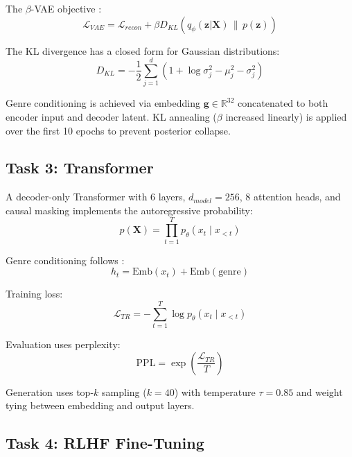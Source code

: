\documentclass[conference]{IEEEtran}
\begin{document}
The $\beta$-VAE objective \cite{higgins2017betavae}:
\begin{equation}
\mathcal{L}_{VAE} = \mathcal{L}_{recon} + \beta
D_{KL}\!\left(q_\phi(\mathbf{z}|\mathbf{X}) \,\|\, p(\mathbf{z})\right)
\end{equation}

The KL divergence has a closed form for Gaussian distributions:
\begin{equation}
D_{KL} = -\frac{1}{2}\sum_{j=1}^{d}
\left(1 + \log\sigma_j^2 - \mu_j^2 - \sigma_j^2\right)
\end{equation}

Genre conditioning is achieved via embedding
$\mathbf{g} \in \mathbb{R}^{32}$ concatenated to both encoder input
and decoder latent. KL annealing ($\beta$ increased linearly) is
applied over the first 10 epochs to prevent posterior collapse.

\subsection{Task 3: Transformer}

A decoder-only Transformer \cite{vaswani2017attention} with 6
layers, $d_{model}=256$, 8 attention heads, and causal masking
implements the autoregressive probability:
\begin{equation}
p(\mathbf{X}) = \prod_{t=1}^{T} p_\theta(x_t \mid x_{<t})
\end{equation}

Genre conditioning follows \cite{huang2018music}:
\begin{equation}
h_t = \text{Emb}(x_t) + \text{Emb}(\text{genre})
\end{equation}

Training loss:
\begin{equation}
\mathcal{L}_{TR} = -\sum_{t=1}^{T} \log p_\theta(x_t \mid x_{<t})
\end{equation}

Evaluation uses perplexity:
\begin{equation}
\text{PPL} = \exp\!\left(\frac{\mathcal{L}_{TR}}{T}\right)
\end{equation}

Generation uses top-$k$ sampling ($k=40$) with temperature
$\tau=0.85$ and weight tying between embedding and output layers.

\subsection{Task 4: RLHF Fine-Tuning}
\end{document}
